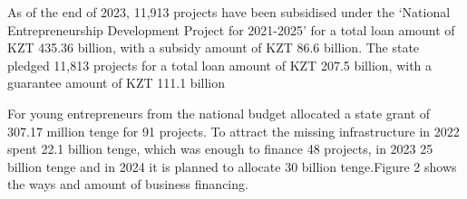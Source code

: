 
As of the end of 2023, 11,913 projects have been subsidised under the
`National Entrepreneurship Development Project for 2021-2025' for a
total loan amount of KZT 435.36 billion, with a subsidy amount of KZT
86.6 billion. The state pledged 11,813 projects for a total loan amount
of KZT 207.5 billion, with a guarantee amount of KZT 111.1 billion

For young entrepreneurs from the national budget allocated a state grant
of 307.17 million tenge for 91 projects. To attract the missing
infrastructure in 2022 spent 22.1 billion tenge, which was enough to
finance 48 projects, in 2023 25 billion tenge and in 2024 it is planned
to allocate 30 billion tenge.Figure 2 shows the ways and amount of
business financing.

